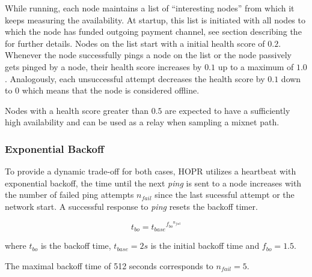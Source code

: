 While running, each node maintains a list of ``interesting nodes'' from which it keeps measuring the availability. At startup, this list is initiated with all nodes to which the node has funded outgoing payment channel, see section describing the  for further details. Nodes on the list start with a initial health score of $0.2$. Whenever the node successfully pings a node on the list or the node passively gets pinged by a node, their health score increases by $0.1$ up to a maximum of $1.0$. Analogously, each unsuccessful attempt decreases the health score by $0.1$ down to $0$ which means that the node is considered offline.

Nodes with a health score greater than $0.5$ are expected to have a sufficiently high availability and can be used as a relay when sampling a mixnet path.

\subsubsection{Exponential Backoff}
\label{sec:p2p:exponential-backoff}

To provide a dynamic trade-off for both cases, HOPR utilizes a heartbeat with exponential backoff, the time until the next \textit{ping} is sent to a node increases with the number of failed ping attempts $n_{fail}$ since the last sucessful attempt or the network start. A successful response to \textit{ping} resets the backoff timer.

$$ t_{bo} = {t_{base}}^{{f_{bo}}^{n_{fail}}} $$

where $t_{bo}$ is the backoff time, $t_{base} = 2s$ is the initial backoff time and $f_{bo} = 1.5$.

The maximal backoff time of 512 seconds corresponds to $n_{fail} = 5$.

